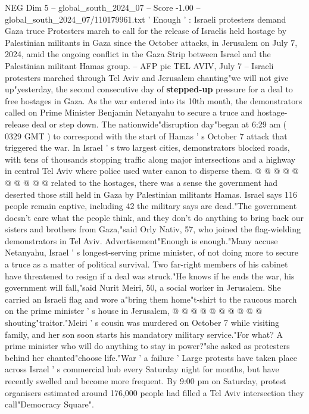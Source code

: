 \begin{textsample}{NEG Dim 5 – global\_south\_2024\_07 – Score -1.00 – global\_south\_2024\_07/110179961.txt}  \label{ex:f5_neg_273}
' Enough ' : Israeli protesters demand Gaza truce Protesters march to call for the release of Israelis held hostage by Palestinian militants in Gaza since the October attacks, in Jerusalem on July 7, 2024, amid the ongoing conflict in the Gaza Strip between Israel and the Palestinian militant Hamas group. -- AFP pic TEL AVIV, July 7 -- Israeli protesters marched through Tel Aviv and Jerusalem chanting"we will not give up"yesterday, the second consecutive day of \textbf{stepped-up} pressure for a deal to free hostages in Gaza.
As the war entered into its 10th month, the demonstrators called on Prime Minister Benjamin Netanyahu to secure a truce and hostage-release deal or step down.
The nationwide"disruption day"began at 6:29 am ( 0329 GMT ) to correspond with the start of Hamas ' s October 7 attack that triggered the war.
In Israel ' s two largest cities, demonstrators blocked roads, with tens of thousands stopping traffic along major intersections and a highway in central Tel Aviv where police used water canon to disperse them. @ @ @ @ @ @ @ @ @ @ related to the hostages, there was a sense the government had deserted those still held in Gaza by Palestinian militants Hamas.
Israel says 116 people remain captive, including 42 the military says are dead."The government doesn't care what the people think, and they don't do anything to bring back our sisters and brothers from Gaza,"said Orly Nativ, 57, who joined the flag-wielding demonstrators in Tel Aviv.
Advertisement"Enough is enough."Many accuse Netanyahu, Israel ' s longest-serving prime minister, of not doing more to secure a truce as a matter of political survival.
Two far-right members of his cabinet have threatened to resign if a deal was struck."He knows if he ends the war, his government will fall,"said Nurit Meiri, 50, a social worker in Jerusalem.
She carried an Israeli flag and wore a"bring them home"t-shirt to the raucous march on the prime minister ' s house in Jerusalem, @ @ @ @ @ @ @ @ @ @ shouting"traitor."Meiri ' s cousin was murdered on October 7 while visiting family, and her son soon starts his mandatory military service."For what?
A prime minister who will do anything to stay in power?"she asked as protesters behind her chanted"choose life."War ' a failure ' Large protests have taken place across Israel ' s commercial hub every Saturday night for months, but have recently swelled and become more frequent.
By 9:00 pm on Saturday, protest organisers estimated around 176,000 people had filled a Tel Aviv intersection they call"Democracy Square".

\end{textsample}
